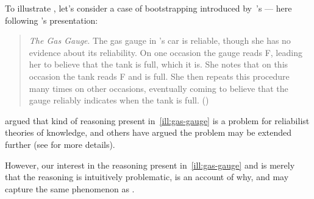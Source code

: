 \begin{note}[Bootstrapping]
  To illustrate \wnf{}, let's consider a case of bootstrapping introduced by~\textcite{Vogel:2000tl}'s --- here following \citeauthor{Weisberg:2010to}'s presentation:
  \begin{quote}
    \begin{illustration}\label{ill:gas-gauge}
      \emph{The Gas Gauge}. The gas gauge in 's car is reliable, though she has no evidence about its reliability.
      On one occasion the gauge reads F, leading her to believe that the tank is full, which it is.
      She notes that on this occasion the tank reads F and is full.
      She then repeats this procedure many times on other occasions, eventually coming to believe that the gauge reliably indicates when the tank is full.\nolinebreak
      \mbox{}\hfill\mbox{(\Citeyear[526--527]{Weisberg:2010to})}\linebreak
      \mbox{}
    \end{illustration}
  \end{quote}
  \citeauthor{Vogel:2000tl} argued that kind of reasoning present in~\autoref{ill:gas-gauge} is a problem for reliabilist theories of knowledge, and others have argued the problem may be extended further (see \textcite[\S1]{Weisberg:2010to} for more details).

  However, our interest in the reasoning present in~\autoref{ill:gas-gauge} and \wnf{} is merely that the reasoning is intuitively problematic, \wnf{} is an account of why, and \wnf{} may capture the same phenomenon as \nI{}.
\end{note}

